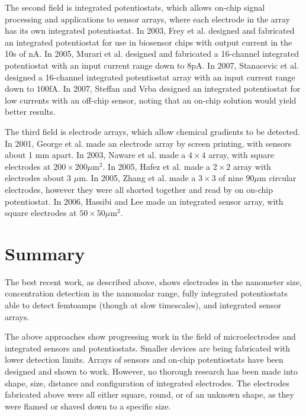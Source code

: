 The second field is integrated potentiostats, which allows on-chip signal processing and applications to sensor arrays, where each electrode in the array has its own integrated potentiostat. In 2003, Frey et al. \cite{frey2003dip} designed and fabricated an integrated potentiostat for use in biosensor chips with output current in the 10s of $\mathrm{nA}$. In 2005, Murari et al. \cite{murari2005ipn} designed and fabricated a 16-channel integrated potentiostat with an input current range down to $8 \mathrm{pA}$. In 2007, Stanacevic et al. \cite{stanacevic2007vpa} designed a 16-channel integrated potentiostat array with an input current range down to $100 \mathrm{fA}$. In 2007, Steffan and Vrba \cite{steffan2007scp} designed an integrated potentiostat for low currents with an off-chip sensor, noting that an on-chip solution would yield better results.

The third field is electrode arrays, which allow chemical gradients to be detected. In 2001, George et al. \cite{george2001fsp} made an electrode array by screen printing, with sensors about 1 $\mathrm{mm}$ apart. In 2003, Naware et al. \cite{naware2003dam} made a $4 \times 4$ array, with square electrodes at $200 \times 200 \mu \mathrm{m}^2$. In 2005, Hafez et al. \cite{hafez2005eif} made a $2 \times 2$ array with electrodes about 3 $\mu \mathrm{m}$. In 2005, Zhang et al. \cite{zhang2005eam} made a $3 \times 3$ of nine $90 \mu \mathrm{m}$ circular electrodes, however they were all shorted together and read by on on-chip potentiostat. In 2006, Hassibi and Lee \cite{hassibi2006pmuc} made an integrated sensor array, with square electrodes at $50 \times 50 \mu \mathrm{m}^2$.

\section{Summary}

The best recent work, as described above, shows electrodes in the nanometer size, concentration detection in the nanomolar range, fully integrated potentiostats able to detect femtoamps (though at slow timescales), and integrated sensor arrays.

The above approaches show progressing work in the field of microelectrodes and integrated sensors and potentiostats. Smaller devices are being fabricated with lower detection limits. Arrays of sensors and on-chip potentiostats have been designed and shown to work. However, no thorough research has been made into shape, size, distance and configuration of integrated electrodes. The electrodes fabricated above were all either square, round, or of an unknown shape, as they were flamed or shaved down to a specific size.
